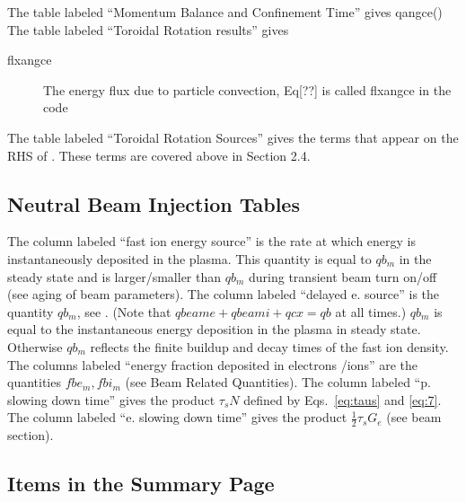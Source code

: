 The table labeled ``Momentum Balance and Confinement Time'' gives
\beq
 qangce(\rho)\equiv 
\eeq
The table labeled ``Toroidal Rotation results'' gives

\begin{description}
 \item[flxangce] The energy flux due to particle convection, Eq[??] is called
 flxangce in the code
\end{description}
The table labeled ``Toroidal Rotation Sources'' gives the terms that appear on
the RHS of . These terms are covered above in Section 2.4.

\subsection{Neutral Beam Injection Tables}
The column labeled ``fast ion energy source'' is 
the rate at which energy is instantaneously
deposited in the plasma. This quantity is equal to $qb_m$ in the
steady state and is larger/smaller than $qb_m$ during
transient beam turn on/off (see aging of beam parameters).
The column labeled ``delayed e. source'' is the quantity
$ qb_m $, see . (Note that $qbeame+qbeami+qcx =qb$
at all times.) $qb_m$ is equal to the instantaneous energy deposition
in the plasma in steady state. Otherwise $qb_m$ reflects the finite
buildup and decay times of the fast ion density.
The columns labeled ``energy fraction deposited in electrons
/ions'' are the quantities $fbe_m,fbi_m$ (see Beam Related
Quantities).
The column labeled ``p. slowing down time'' gives the product
$\tau_s N$ defined by Eqs.~\eqref{eq:taus} and \eqref{eq:7}.
The column labeled ``e. slowing down time'' gives the product
$\frac{1}{2}\tau_s G_e$ (see beam section).

\subsection {Items in the Summary Page}

